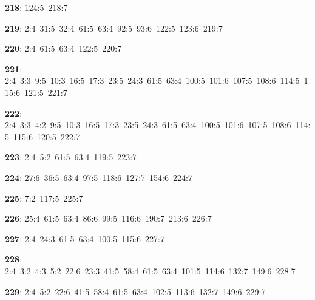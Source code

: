 \noindent \textbf{218}: 124:5\allowbreak\ 218:7\par
\noindent \textbf{219}: 2:4\allowbreak\ 31:5\allowbreak\ 32:4\allowbreak\ 61:5\allowbreak\ 63:4\allowbreak\ 92:5\allowbreak\ 93:6\allowbreak\ 122:5\allowbreak\ 123:6\allowbreak\ 219:7\par
\noindent \textbf{220}: 2:4\allowbreak\ 61:5\allowbreak\ 63:4\allowbreak\ 122:5\allowbreak\ 220:7\par
\noindent \textbf{221}: 2:4\allowbreak\ 3:3\allowbreak\ 9:5\allowbreak\ 10:3\allowbreak\ 16:5\allowbreak\ 17:3\allowbreak\ 23:5\allowbreak\ 24:3\allowbreak\ 61:5\allowbreak\ 63:4\allowbreak\ 100:5\allowbreak\ 101:6\allowbreak\ 107:5\allowbreak\ 108:6\allowbreak\ 114:5\allowbreak\ 115:6\allowbreak\ 121:5\allowbreak\ 221:7\par
\noindent \textbf{222}: 2:4\allowbreak\ 3:3\allowbreak\ 4:2\allowbreak\ 9:5\allowbreak\ 10:3\allowbreak\ 16:5\allowbreak\ 17:3\allowbreak\ 23:5\allowbreak\ 24:3\allowbreak\ 61:5\allowbreak\ 63:4\allowbreak\ 100:5\allowbreak\ 101:6\allowbreak\ 107:5\allowbreak\ 108:6\allowbreak\ 114:5\allowbreak\ 115:6\allowbreak\ 120:5\allowbreak\ 222:7\par
\noindent \textbf{223}: 2:4\allowbreak\ 5:2\allowbreak\ 61:5\allowbreak\ 63:4\allowbreak\ 119:5\allowbreak\ 223:7\par
\noindent \textbf{224}: 27:6\allowbreak\ 36:5\allowbreak\ 63:4\allowbreak\ 97:5\allowbreak\ 118:6\allowbreak\ 127:7\allowbreak\ 154:6\allowbreak\ 224:7\par
\noindent \textbf{225}: 7:2\allowbreak\ 117:5\allowbreak\ 225:7\par
\noindent \textbf{226}: 25:4\allowbreak\ 61:5\allowbreak\ 63:4\allowbreak\ 86:6\allowbreak\ 99:5\allowbreak\ 116:6\allowbreak\ 190:7\allowbreak\ 213:6\allowbreak\ 226:7\par
\noindent \textbf{227}: 2:4\allowbreak\ 24:3\allowbreak\ 61:5\allowbreak\ 63:4\allowbreak\ 100:5\allowbreak\ 115:6\allowbreak\ 227:7\par
\noindent \textbf{228}: 2:4\allowbreak\ 3:2\allowbreak\ 4:3\allowbreak\ 5:2\allowbreak\ 22:6\allowbreak\ 23:3\allowbreak\ 41:5\allowbreak\ 58:4\allowbreak\ 61:5\allowbreak\ 63:4\allowbreak\ 101:5\allowbreak\ 114:6\allowbreak\ 132:7\allowbreak\ 149:6\allowbreak\ 228:7\par
\noindent \textbf{229}: 2:4\allowbreak\ 5:2\allowbreak\ 22:6\allowbreak\ 41:5\allowbreak\ 58:4\allowbreak\ 61:5\allowbreak\ 63:4\allowbreak\ 102:5\allowbreak\ 113:6\allowbreak\ 132:7\allowbreak\ 149:6\allowbreak\ 229:7\par

